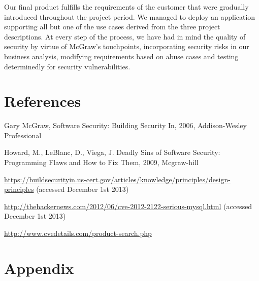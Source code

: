 \documentclass[a4paper]{article}
\begin{document}
Our final product fulfills the requirements of the customer that were gradually introduced throughout the project period. 
We managed to deploy an application supporting all but one of the use cases derived from the three project descriptions. 
At every step of the process, we have had in mind the quality of security by virtue of McGraw's touchpoints\cite{McGraw2006}, incorporating security risks in our business analysis, modifying requirements based on abuse cases and testing determinedly for security vulnerabilities.


\newpage
\section{References}
\begin{thebibliography}{9}
Gary McGraw,
Software Security: Building Security In,
2006,
Addison-Wesley Professional 

Howard, M., LeBlanc, D., Viega, J.
Deadly Sins of Software Security: Programming Flaws and How to Fix Them,
2009,
Mcgraw-hill

\href{https://buildsecurityin.us-cert.gov/articles/knowledge/principles/design-principles}{https://buildsecurityin.us-cert.gov/articles/knowledge/principles/design-principles} (accessed December 1st 2013)

\href{http://thehackernews.com/2012/06/cve-2012-2122-serious-mysql.html}{http://thehackernews.com/2012/06/cve-2012-2122-serious-mysql.html} 
 (accessed December 1st 2013)
 
\href{http://www.cvedetails.com/product-search.php}{http://www.cvedetails.com/product-search.php}
\end{thebibliography}

\newpage
\section{Appendix}
\end{document}
